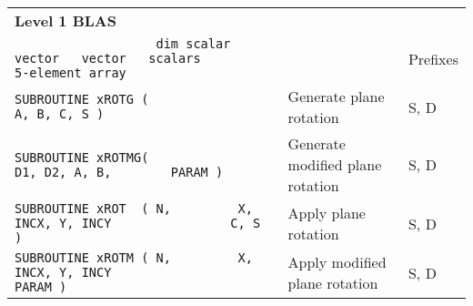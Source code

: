 \documentclass[10pt,a3paper, landscape]{article}
\begin{document}
	\pagestyle{empty}
	\centering
	
	\hspace{0.5cm}
	\begin{tabular}{lll}
		\multicolumn{3}{l}{\Large{\textbf{Level 1 BLAS}}}                                                                                                                                                                                                                                                                                                                                    \\
		\verb|                   dim scalar vector   vector   scalars              5-element array     | &                                                                                                                                                                                                                                                              & Prefixes           \\
		\verb|SUBROUTINE xROTG (                                      A, B, C, S )                     | & Generate plane rotation                                                                                                                                                                                                                                      & S, D               \\
		\verb|SUBROUTINE xROTMG(                              D1, D2, A, B,        PARAM )             | & Generate modified plane rotation                                                                                                                                                                                                                             & S, D               \\
		\verb|SUBROUTINE xROT  ( N,         X, INCX, Y, INCY                C, S )                     | & Apply plane rotation                                                                                                                                                                                                                                         & S, D               \\
		\verb|SUBROUTINE xROTM ( N,         X, INCX, Y, INCY                       PARAM )             | & Apply modified plane rotation                                                                                                                                                                                                                                & S, D               \\

\end{tabular}
\end{document}
